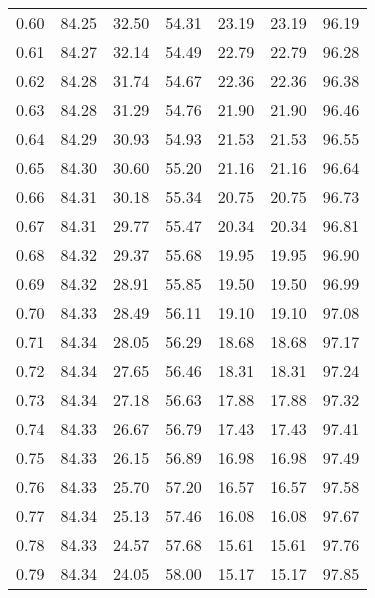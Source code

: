 \begin{tabular}{|c|c|c|c|c|c|c|}
      0.60 &     84.25 &     32.50 &      54.31 &   23.19 &      23.19 &         96.19 \\
      0.61 &     84.27 &     32.14 &      54.49 &   22.79 &      22.79 &         96.28 \\
      0.62 &     84.28 &     31.74 &      54.67 &   22.36 &      22.36 &         96.38 \\
      0.63 &     84.28 &     31.29 &      54.76 &   21.90 &      21.90 &         96.46 \\
      0.64 &     84.29 &     30.93 &      54.93 &   21.53 &      21.53 &         96.55 \\
      0.65 &     84.30 &     30.60 &      55.20 &   21.16 &      21.16 &         96.64 \\
      0.66 &     84.31 &     30.18 &      55.34 &   20.75 &      20.75 &         96.73 \\
      0.67 &     84.31 &     29.77 &      55.47 &   20.34 &      20.34 &         96.81 \\
      0.68 &     84.32 &     29.37 &      55.68 &   19.95 &      19.95 &         96.90 \\
      0.69 &     84.32 &     28.91 &      55.85 &   19.50 &      19.50 &         96.99 \\
      0.70 &     84.33 &     28.49 &      56.11 &   19.10 &      19.10 &         97.08 \\
      0.71 &     84.34 &     28.05 &      56.29 &   18.68 &      18.68 &         97.17 \\
      0.72 &     84.34 &     27.65 &      56.46 &   18.31 &      18.31 &         97.24 \\
      0.73 &     84.34 &     27.18 &      56.63 &   17.88 &      17.88 &         97.32 \\
      0.74 &     84.33 &     26.67 &      56.79 &   17.43 &      17.43 &         97.41 \\
      0.75 &     84.33 &     26.15 &      56.89 &   16.98 &      16.98 &         97.49 \\
      0.76 &     84.33 &     25.70 &      57.20 &   16.57 &      16.57 &         97.58 \\
      0.77 &     84.34 &     25.13 &      57.46 &   16.08 &      16.08 &         97.67 \\
      0.78 &     84.33 &     24.57 &      57.68 &   15.61 &      15.61 &         97.76 \\
      0.79 &     84.34 &     24.05 &      58.00 &   15.17 &      15.17 &         97.85 \\

\end{tabular}
